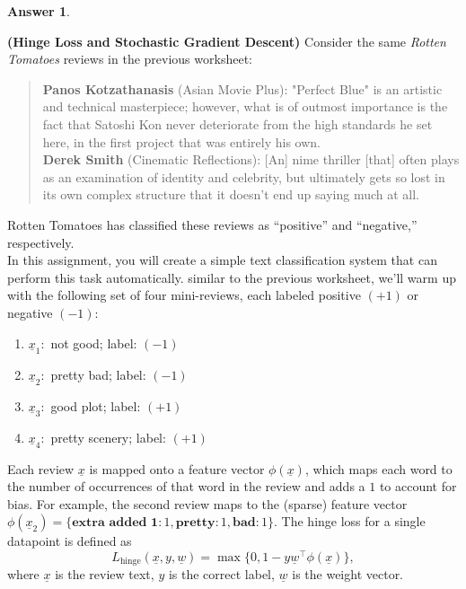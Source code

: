 \documentclass{article}
\theoremstyle{definition}
\newtheorem*{answer}{Answer}
\begin{document}
\begin{question}[start=0]
\begin{question}
\begin{answer}
			\end{answer}
		\end{question}
		\item \textbf{(Hinge Loss and Stochastic Gradient Descent)} Consider the same \textit{Rotten Tomatoes} reviews in the previous worksheet:
		\begin{quote}
			\textbf{Panos Kotzathanasis} (Asian Movie Plus): "Perfect Blue" is an artistic and technical masterpiece; however, what is of outmost importance is the fact that Satoshi Kon never deteriorate from the high standards he set here, in the first project that was entirely his own.\\
			
			\textbf{Derek Smith} (Cinematic Reflections): [An] nime thriller [that] often plays as an examination of identity and celebrity, but ultimately gets so lost in its own complex structure that it doesn't end up saying much at all.
		\end{quote}
		
		Rotten Tomatoes has classified these reviews as ``positive'' and ``negative,'' respectively.\\
		
		In this assignment, you will create a simple text classification system that can perform this task automatically. similar to the previous worksheet, we'll warm up with the following set of four mini-reviews, each labeled positive $(+1)$ or negative $(-1)$:
		\begin{enumerate}
			\item $\underline{x}_1:$ not good; label: $(-1)$
			\item $\underline{x}_2:$ pretty bad; label: $(-1)$
			\item $\underline{x}_3:$ good plot; label: $(+1)$
			\item $\underline{x}_4:$ pretty scenery; label: $(+1)$
		\end{enumerate}
		
		Each review $\underline{x}$ is mapped onto a feature vector $\phi(\underline{x})$, which maps each word to the number of occurrences of that word in the review and adds a $1$ to account for bias. For example, the second review maps to the (sparse) feature vector $\phi(\underline{x}_2)=\{\textbf{extra added 1}:1, \textbf{pretty}:1,\textbf{bad}:1\}$. The hinge loss for a single datapoint is defined as
		\begin{equation*}
			L_{\text{hinge}}(\underline{x}, y,\underline{w})= \max\{0, 1-y\underline{w}^\top\phi(\underline{x})\},
		\end{equation*}
		where $\underline{x}$ is the review text, $y$ is the correct label, $\underline{w}$ is the weight vector.\\


\end{question}
\end{document}
